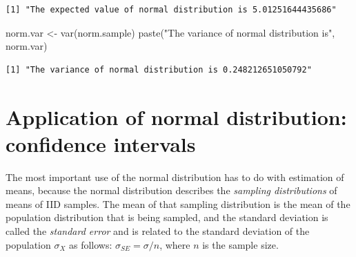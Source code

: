 \documentclass[
  letterpaper,
  DIV=11,
  numbers=noendperiod]{scrreprt}
\newenvironment{Shaded}{\begin{snugshade}}{\end{snugshade}}
\newcommand{\FunctionTok}[1]{\textcolor[rgb]{0.28,0.35,0.67}{#1}}
\newcommand{\NormalTok}[1]{\textcolor[rgb]{0.00,0.23,0.31}{#1}}
\newcommand{\OtherTok}[1]{\textcolor[rgb]{0.00,0.23,0.31}{#1}}
\newcommand{\StringTok}[1]{\textcolor[rgb]{0.13,0.47,0.30}{#1}}
\begin{document}
\begin{verbatim}
[1] "The expected value of normal distribution is 5.01251644435686"
\end{verbatim}

\begin{Shaded}
\begin{Highlighting}[]
\NormalTok{norm.var }\OtherTok{\textless{}{-}} \FunctionTok{var}\NormalTok{(norm.sample)}
\FunctionTok{paste}\NormalTok{(}\StringTok{"The variance of normal distribution is"}\NormalTok{, norm.var)}
\end{Highlighting}
\end{Shaded}

\begin{verbatim}
[1] "The variance of normal distribution is 0.248212651050792"
\end{verbatim}

\hypertarget{application-of-normal-distribution-confidence-intervals}{%
\section{Application of normal distribution: confidence
intervals}\label{application-of-normal-distribution-confidence-intervals}}

The most important use of the normal distribution has to do with
estimation of means, because the normal distribution describes the
\emph{sampling distributions} of means of IID samples. The mean of that
sampling distribution is the mean of the population distribution that is
being sampled, and the standard deviation is called the \emph{standard
error} and is related to the standard deviation of the population
\(\sigma_X\) as follows: \(\sigma_{SE} = \sigma/n\), where \(n\) is the
sample size.
\end{document}
